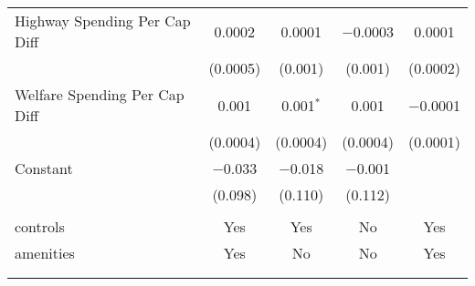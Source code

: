 \begin{table}[!htbp]
\begin{tabular}{@{\extracolsep{5pt}}lcccc}
  Highway Spending Per Cap Diff & 0.0002 & 0.0001 & $-$0.0003 & 0.0001 \\ 
  & (0.0005) & (0.001) & (0.001) & (0.0002) \\ 
  Welfare Spending Per Cap Diff & 0.001 & 0.001$^{*}$ & 0.001 & $-$0.0001 \\ 
  & (0.0004) & (0.0004) & (0.0004) & (0.0001) \\ 
  Constant & $-$0.033 & $-$0.018 & $-$0.001 &  \\ 
  & (0.098) & (0.110) & (0.112) &  \\ 
 \hline \\[-1.8ex] 
controls & Yes & Yes & No & Yes \\ 
amenities & Yes & No & No & Yes \\ 
\hline \\[-1.8ex] 
\hline 
\hline \\[-1.8ex] 
\end{tabular} 
\end{table} 
